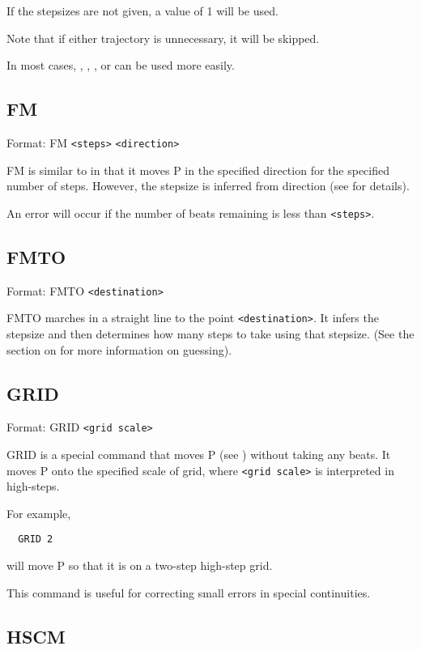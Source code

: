 If the stepsizes are not given, a value of 1 will be used.

Note that if either trajectory is unnecessary, it will be skipped.

In most cases, , ,
, or  can be used more easily.

\subsection{FM}\label{fm}

Format: FM \verb$<steps>$ \verb$<direction>$

FM is similar to  in that it moves P in the
specified direction for the specified number of steps.  However, the
stepsize is inferred from direction (see 
for details).

An error will occur if the number of beats remaining is less than
\verb$<steps>$.

\subsection{FMTO}\label{fmto}

Format: FMTO \verb$<destination>$

FMTO marches in a straight line to the point \verb$<destination>$.  It
infers the stepsize and then determines how many steps to take using
that stepsize.  (See the section on  for
more information on guessing).

\subsection{GRID}\label{grid}

Format: GRID \verb$<grid scale>$

GRID is a special command that moves P (see )
without taking any beats.  It moves P onto the specified scale of grid,
where \verb$<grid scale>$ is interpreted in high-steps.

For example,
\begin{verbatim}
  GRID 2
\end{verbatim}
will move P so that it is on a two-step high-step grid.

This command is useful for correcting small errors in special continuities.

\subsection{HSCM}\label{hscm}

